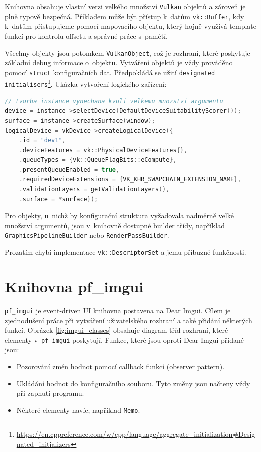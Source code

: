 Knihovna obsahuje vlastní verzi velkého množství \texttt{Vulkan} objektů a zároveň je plně typově bezpečná. Příkladem může být přístup k~datům \texttt{vk::Buffer}, kdy k~datům přistupujeme pomocí mapovacího objektu, který hojně využívá template funkcí pro kontrolu offsetu a správné práce s~pamětí.

Všechny objekty jsou potomkem \texttt{VulkanObject}, což je rozhraní, které poskytuje základní debug informace o~objektu. Vytváření objektů je vždy prováděno pomocí \texttt{struct} konfiguračních dat. Předpokládá se užití \texttt{designated initialisers}\footnote{\url{https://en.cppreference.com/w/cpp/language/aggregate_initialization#Designated_initializers}}. Ukázka vytvoření logického zařízení:

\begin{lstlisting}[language=C++, caption={Tvorba logického zařízení}]
// tvorba instance vynechana kvuli velkemu mnozstvi argumentu
device = instance->selectDevice(DefaultDeviceSuitabilityScorer());
surface = instance->createSurface(window);
logicalDevice = vkDevice->createLogicalDevice({
    .id = "dev1",
    .deviceFeatures = vk::PhysicalDeviceFeatures{},
    .queueTypes = {vk::QueueFlagBits::eCompute},
    .presentQueueEnabled = true,
    .requiredDeviceExtensions = {VK_KHR_SWAPCHAIN_EXTENSION_NAME},
    .validationLayers = getValidationLayers(),
    .surface = *surface});
\end{lstlisting}

Pro objekty, u~nichž by konfigurační struktura vyžadovala nadměrně velké množství argumentů, jsou v~knihovně dostupné builder třídy, například \texttt{GraphicsPipelineBuilder} nebo \texttt{RenderPassBuilder}.

Prozatím chybí implementace \texttt{vk::DescriptorSet} a jemu příbuzné funkčnosti.


\section{Knihovna pf\_imgui}
\texttt{pf\_imgui} je event-driven UI knihovna postavena na Dear Imgui. Cílem je zjednodušení práce při vytváření uživatelského rozhraní a také přidání některých funkcí. Obrázek \ref{fig:imgui_classes} obsahuje diagram tříd rozhraní, které elementy v~\texttt{pf\_imgui} poskytují. Funkce, které jsou oproti Dear Imgui přidané jsou:

\begin{itemize}
	\item Pozorování změn hodnot pomocí callback funkcí (observer pattern).
	\item Ukládání hodnot do konfiguračního souboru. Tyto změny jsou načteny vždy při zapnutí programu.
	\item Některé elementy navíc, například \texttt{Memo}.
\end{itemize}

